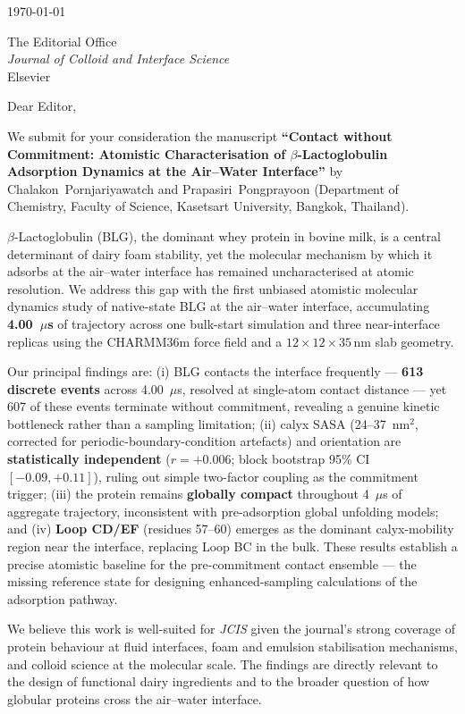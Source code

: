 \documentclass[11pt,a4paper]{article}
\begin{document}
\date{\today}
\noindent\today

\bigskip

\noindent The Editorial Office\\
\textit{Journal of Colloid and Interface Science}\\
Elsevier

\bigskip

Dear Editor,

We submit for your consideration the manuscript \textbf{``Contact without
Commitment: Atomistic Characterisation of $\beta$-Lactoglobulin Adsorption
Dynamics at the Air--Water Interface''} by Chalakon~Pornjariyawatch and
Prapasiri~Pongprayoon (Department of Chemistry, Faculty of Science, Kasetsart
University, Bangkok, Thailand).

$\beta$-Lactoglobulin (BLG), the dominant whey protein in bovine milk, is a
central determinant of dairy foam stability, yet the molecular mechanism by
which it adsorbs at the air--water interface has remained uncharacterised at
atomic resolution. We address this gap with the first unbiased atomistic
molecular dynamics study of native-state BLG at the air--water interface,
accumulating \textbf{4.00~$\mu$s} of trajectory across one bulk-start simulation
and three near-interface replicas using the CHARMM36m force field and a
$12\times12\times35$\,nm slab geometry.

Our principal findings are: (i) BLG contacts the interface frequently ---
\textbf{613 discrete events} across 4.00~$\mu$s, resolved at single-atom
contact distance --- yet 607 of these events terminate without commitment,
revealing a genuine kinetic bottleneck rather than a sampling limitation;
(ii) calyx SASA (24--37~nm$^2$, corrected for periodic-boundary-condition
artefacts) and orientation are \textbf{statistically independent}
($r = +0.006$; block bootstrap 95\% CI $[-0.09, +0.11]$), ruling out simple
two-factor coupling as the commitment trigger; (iii) the protein remains
\textbf{globally compact} throughout 4~$\mu$s of aggregate trajectory,
inconsistent with pre-adsorption global unfolding models; and (iv)
\textbf{Loop CD/EF} (residues 57--60) emerges as the dominant calyx-mobility
region near the interface, replacing Loop BC in the bulk. These results
establish a precise atomistic baseline for the pre-commitment contact ensemble
--- the missing reference state for designing enhanced-sampling calculations
of the adsorption pathway.

We believe this work is well-suited for \textit{JCIS} given the journal's
strong coverage of protein behaviour at fluid interfaces, foam and emulsion
stabilisation mechanisms, and colloid science at the molecular scale. The
findings are directly relevant to the design of functional dairy ingredients
and to the broader question of how globular proteins cross the air--water
interface.
\end{document}
